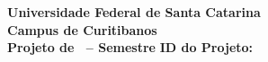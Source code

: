 \documentclass[10pt,a4paper]{article}
\makeatletter
\newcommand{\myCourse}{\@Course}
\newcommand{\mySemester}{\@Semester}
\newcommand{\myID}{\@ID}
\makeatother
\begin{document}
\thispagestyle{empty}
{\sf
\begin{center}
    \textbf{\LARGE Universidade Federal de Santa Catarina}\\[0.15cm]
    \textbf{\Large Campus de Curitibanos}\\[0.5cm]
    \textbf{\large Projeto de \myCourse \ -- Semestre \mySemester} \hfill \textbf{ID do Projeto: \myID}
\end{center}

\vspace{0.3cm}

\noindent{}
}

\vspace*{0.8cm}

\begin{enumerate}
\setlength{\itemsep}{1.5em} %
\end{enumerate}
\end{document}

